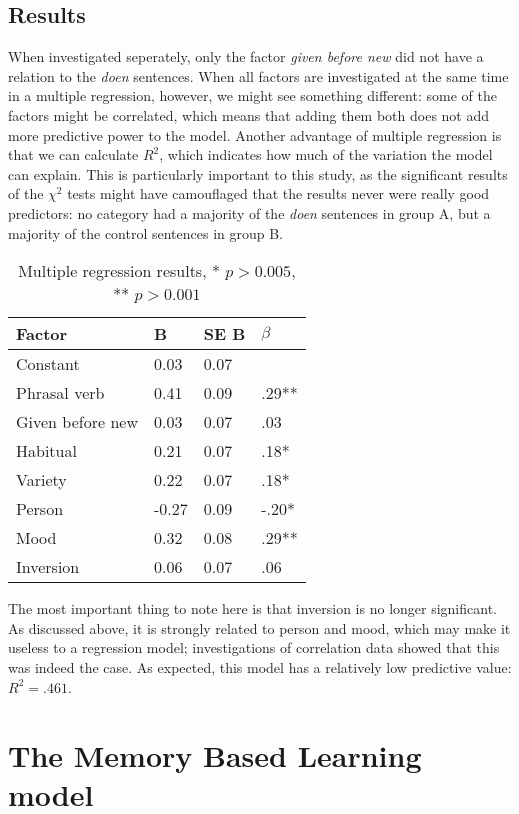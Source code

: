 \documentclass[12pt]{article}
\begin{document}
\subsection{Results} \label{regressionresults}

When investigated seperately, only the factor \emph{given before new} did not have a relation to the \emph{doen} sentences. When all factors are investigated at the same time in a multiple regression, however, we might see something different: some of the factors might be correlated, which means that adding them both does not add more predictive power to the model. Another advantage of multiple regression is that we can calculate $R^2$, which indicates how much of the variation the model can explain. This is particularly important to this study, as the significant results of the $\chi^2$ tests might have camouflaged that the results never were really good predictors: no category had a majority of the \emph{doen} sentences in group A, but a majority of the control sentences in group B.

\begin{table}[h] \centering
\begin{tabular}{|l||l|l|l|}
\hline
Factor&B&SE B& $\beta$ \\
\hline
Constant&0.03&0.07&\\
Phrasal verb&0.41&0.09&.29**\\
Given before new&0.03&0.07&.03\\
Habitual&0.21&0.07&.18*\\
Variety&0.22&0.07&.18*\\
Person&-0.27&0.09&-.20*\\
Mood&0.32&0.08&.29**\\
Inversion&0.06&0.07&.06\\
\hline
\end{tabular}
\caption{Multiple regression results, * $ p > 0.005$, **  $p > 0.001$ }
\end{table}
The most important thing to note here is that inversion is no longer significant. As discussed above, it is strongly related to person and mood, which may make it useless to a regression model; investigations of correlation data showed that this was indeed the case. As expected, this model has a relatively low predictive value: $R^2 = .461$.\\\indent

\section{The Memory Based Learning model} \label{mbl}
\end{document}
